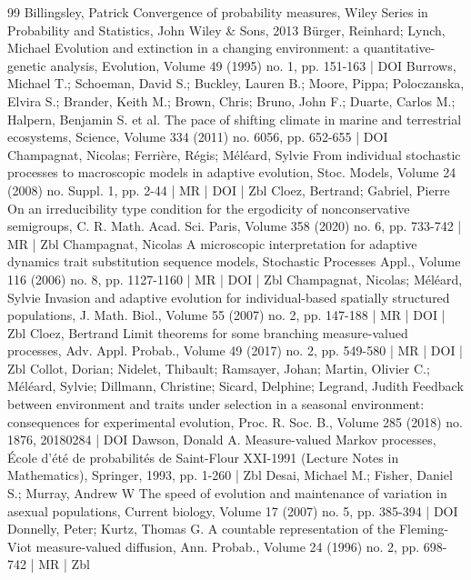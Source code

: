 \begin{thebibliography}{99}
Billingsley, Patrick Convergence of probability measures, Wiley Series in Probability and Statistics, John Wiley \& Sons, 2013
Bürger, Reinhard; Lynch, Michael Evolution and extinction in a changing environment: a quantitative-genetic analysis, Evolution, Volume 49 (1995) no. 1, pp. 151-163 | DOI
Burrows, Michael T.; Schoeman, David S.; Buckley, Lauren B.; Moore, Pippa; Poloczanska, Elvira S.; Brander, Keith M.; Brown, Chris; Bruno, John F.; Duarte, Carlos M.; Halpern, Benjamin S. et al. The pace of shifting climate in marine and terrestrial ecosystems, Science, Volume 334 (2011) no. 6056, pp. 652-655 | DOI
Champagnat, Nicolas; Ferrière, Régis; Méléard, Sylvie From individual stochastic processes to macroscopic models in adaptive evolution, Stoc. Models, Volume 24 (2008) no. Suppl. 1, pp. 2-44 | MR | DOI | Zbl
Cloez, Bertrand; Gabriel, Pierre On an irreducibility type condition for the ergodicity of nonconservative semigroups, C. R. Math. Acad. Sci. Paris, Volume 358 (2020) no. 6, pp. 733-742 | MR | Zbl
Champagnat, Nicolas A microscopic interpretation for adaptive dynamics trait substitution sequence models, Stochastic Processes Appl., Volume 116 (2006) no. 8, pp. 1127-1160 | MR | DOI | Zbl
Champagnat, Nicolas; Méléard, Sylvie Invasion and adaptive evolution for individual-based spatially structured populations, J. Math. Biol., Volume 55 (2007) no. 2, pp. 147-188 | MR | DOI | Zbl
Cloez, Bertrand Limit theorems for some branching measure-valued processes, Adv. Appl. Probab., Volume 49 (2017) no. 2, pp. 549-580 | MR | DOI | Zbl
Collot, Dorian; Nidelet, Thibault; Ramsayer, Johan; Martin, Olivier C.; Méléard, Sylvie; Dillmann, Christine; Sicard, Delphine; Legrand, Judith Feedback between environment and traits under selection in a seasonal environment: consequences for experimental evolution, Proc. R. Soc. B., Volume 285 (2018) no. 1876, 20180284 | DOI
Dawson, Donald A. Measure-valued Markov processes, École d’été de probabilités de Saint-Flour XXI-1991 (Lecture Notes in Mathematics), Springer, 1993, pp. 1-260 | Zbl
Desai, Michael M.; Fisher, Daniel S.; Murray, Andrew W The speed of evolution and maintenance of variation in asexual populations, Current biology, Volume 17 (2007) no. 5, pp. 385-394 | DOI
Donnelly, Peter; Kurtz, Thomas G. A countable representation of the Fleming-Viot measure-valued diffusion, Ann. Probab., Volume 24 (1996) no. 2, pp. 698-742 | MR | Zbl

\end{thebibliography}
